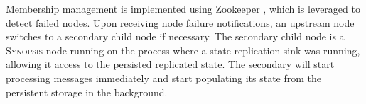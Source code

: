 Membership management is implemented using Zookeeper \cite{hunt2010zookeeper}, which is leveraged to detect failed nodes.
Upon receiving node failure notifications, an upstream node switches to a secondary child node if necessary. The secondary child node is a \textsc{Synopsis} node running on the process where a state replication sink was running, allowing it access to the persisted replicated state.
The secondary will start processing messages immediately and start populating its state from the persistent storage in the background.

